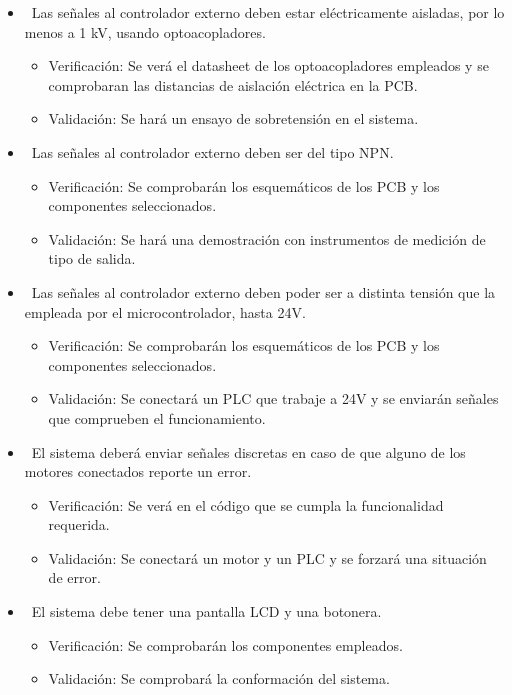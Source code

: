 \documentclass[
11pt, %
]{charter}
\begin{document}
\begin{itemize}
\begin{itemize}
	\end{itemize}
	\item \REQ ~Las señales al controlador externo deben estar eléctricamente aisladas, por lo menos a 1 kV, usando optoacopladores.
	\begin{itemize}
		\item Verificación: Se verá el datasheet de los optoacopladores empleados y se comprobaran las distancias de aislación eléctrica en la PCB.
		\item Validación: Se hará un ensayo de sobretensión en el sistema.
	\end{itemize}
	\item \REQ ~Las señales al controlador externo deben ser del tipo NPN.
	\begin{itemize}
		\item Verificación: Se comprobarán los esquemáticos de los PCB y los componentes seleccionados.
		\item Validación: Se hará una demostración con instrumentos de medición de tipo de salida.
	\end{itemize}
	\item \REQ ~Las señales al controlador externo deben poder ser a distinta tensión que la empleada por el microcontrolador, hasta 24V.
	\begin{itemize}
		\item Verificación: Se comprobarán los esquemáticos de los PCB y los componentes seleccionados.
		\item Validación: Se conectará un PLC que trabaje a 24V y se enviarán señales que comprueben el funcionamiento.
	\end{itemize}
	\item \REQ ~El sistema deberá enviar señales discretas en caso de que alguno de los motores conectados reporte un error.
	\begin{itemize}
		\item Verificación: Se verá en el código que se cumpla la funcionalidad requerida.
		\item Validación: Se conectará un motor y un PLC y se forzará una situación de error.
	\end{itemize}
	\item \REQ ~El sistema debe tener una pantalla LCD y una botonera.
	\begin{itemize}
		\item Verificación: Se comprobarán los componentes empleados.
		\item Validación: Se comprobará la conformación del sistema.

\end{itemize}
\end{itemize}
\end{document}
